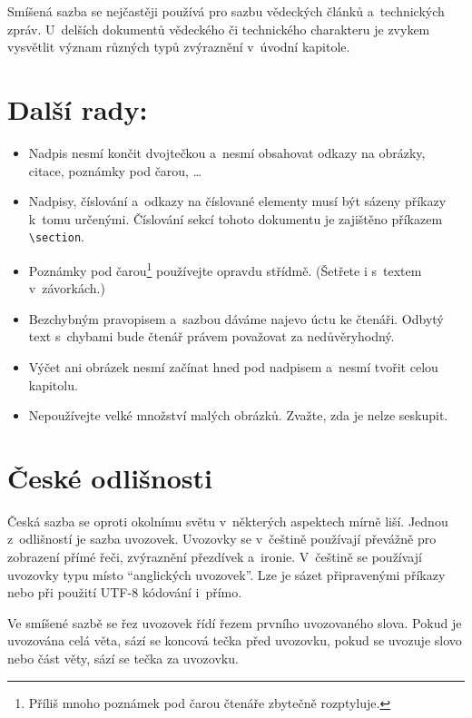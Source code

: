 \documentclass[a4paper, 10pt, twocolumn]{article}
\begin{document}
        Smíšená sazba se nejčastěji používá pro sazbu vědeckých článků a~technických zpráv. U~delších dokumentů vědeckého či technického charakteru je zvykem vysvětlit význam různých typů zvýraznění v~úvodní kapitole.
    
    \section{Další rady:}\label{rady}
        \begin{itemize}          
            \item Nadpis nesmí končit dvojtečkou a~nesmí obsahovat odkazy na obrázky, citace, poznámky pod čarou,\,\,\dots
            \item Nadpisy, číslování a~odkazy na číslované elementy musí být sázeny příkazy k~tomu určenými.
            Číslování sekcí tohoto dokumentu je zajištěno příkazem \verb|\section|.
            \item Poznámky pod čarou\footnote{Příliš mnoho poznámek pod čarou čtenáře zbytečně rozptyluje.} používejte opravdu střídmě. (Šetřete i s~textem v~závorkách.)
            \item Bezchybným pravopisem a~sazbou dáváme najevo úctu ke čtenáři.
            Odbytý text s~chybami bude čtenář právem považovat za nedůvěryhodný.
            \item Výčet ani obrázek nesmí začínat hned pod nadpisem a~nesmí tvořit celou kapitolu.
            \item Nepoužívejte velké množství malých obrázků.
            Zvažte, zda je nelze seskupit.
        \end{itemize}
    
    \section{České odlišnosti}\label{ceske}    
        Česká sazba se oproti okolnímu světu v~některých aspektech mírně liší. Jednou z~odlišností je sazba uvozovek. Uvozovky se v~češtině používají převážně pro zobrazení přímé řeči, zvýraznění přezdívek a~ironie. V~češtině se používají uvozovky typu  místo ``anglických uvozovek''. Lze je sázet připravenými příkazy nebo při použití UTF-8 kódování i~přímo.
        
        Ve smíšené sazbě se řez uvozovek řídí řezem prvního uvozovaného slova. Pokud je uvozována celá věta, sází se koncová tečka před uvozovku, pokud se uvozuje slovo nebo část věty, sází se tečka za uvozovku.
        
\end{document}
